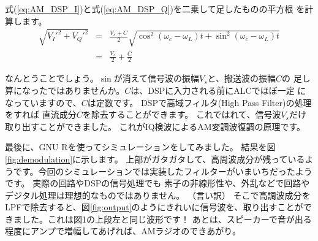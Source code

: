 式(\ref{eq:AM_DSP_I})と式(\ref{eq:AM_DSP_Q})を二乗して足したものの平方根
を計算します。
\begin{eqnarray}
\sqrt{V_I'^2 + V_Q'^2} &=& \frac{V_s+C}{2}\sqrt{\cos^2(\omega_c - \omega_L)t + \sin^2(\omega_c - \omega_L)t }\\
&=& \frac{V_s}{2} + \frac{C}{2} 
\end{eqnarray}

なんとうことでしょう。$\sin$が消えて信号波の振幅$V_s$と、搬送波の振幅$C$の
足し算になったではありませんか。$C$は、DSPに入力される前にALCでほぼ一定
になっていますので、$C$は定数です。
DSPで高域フィルタ(High Pass Filter)の処理をすれば
直流成分$C$を除去することができます。
これではれて、信号波$V_s$だけ取り出すことができました。
これがIQ検波によるAM変調波復調の原理です。

最後に、GNU Rを使ってシミュレーションをしてみました。
結果を図\ref{fig:demodulation}に示します。
上部がガタガタして、高周波成分が残っているようです。今回のシミュレーションでは実装したフィルターがいまいちだったようです。
実際の回路やDSPの信号処理でも
素子の非線形性や、外乱などで回路やデジタル処理は理想的なものではありません。
（言い訳）
そこで高調波成分をLPFで除去すると、図\ref{fig:output}のようにきれいに信号波を、取り出すことができました。これは図1の上段左と同じ波形です！
あとは、スピーカーで音が出る程度にアンプで増幅してあげれば、AMラジオのできあがり。
